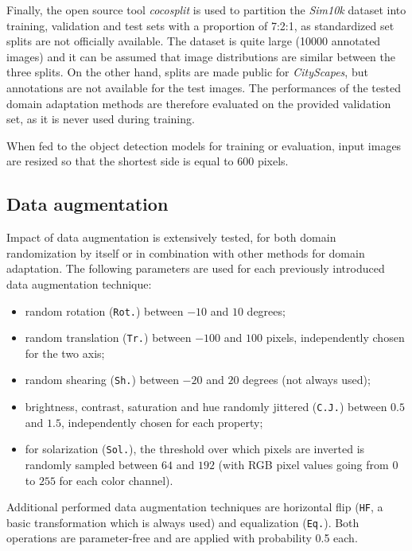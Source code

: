 \documentclass[%
    corpo=12pt,
    twoside,
    stile=classica,   
    tipotesi=magistrale,
    evenboxes,
    english,
	numerazioneromana,
]{toptesi}
\begin{document}
\medskip
Finally, the open source tool \textit{cocosplit}\cite{cocosplit} is used to partition the \textit{Sim10k} dataset into training, validation and test sets with a proportion of 7\string:2\string:1, as standardized set splits are not officially available. The dataset is quite large (10000 annotated images) and it can be assumed that image distributions are similar between the three splits. On the other hand, splits are made public for \textit{CityScapes}, but annotations are not available for the test images. The performances of the tested domain adaptation methods are therefore evaluated on the provided validation set, as it is never used during training.

\medskip
When fed to the object detection models for training or evaluation, input images are resized so that the shortest side is equal to 600 pixels.

\subsection{Data augmentation}
Impact of data augmentation is extensively tested, for both domain randomization by itself or in combination with other methods for domain adaptation. The following parameters are used for each previously introduced data augmentation technique:
\begin{itemize}
	\item random rotation (\texttt{Rot.}) between $ -10 $ and $ 10 $ degrees;
	\item random translation (\texttt{Tr.}) between $ -100 $ and $ 100 $ pixels, independently chosen for the two axis;
	\item random shearing (\texttt{Sh.}) between $-20$ and $20$ degrees (not always used);
	\item brightness, contrast, saturation and hue randomly jittered (\texttt{C.J.}) between $ 0.5 $ and $ 1.5 $, independently chosen for each property;
	\item for solarization (\texttt{Sol.}), the threshold over which pixels are inverted is randomly sampled between $ 64 $ and $ 192 $ (with RGB pixel values going from $ 0 $ to $ 255 $ for each color channel).
\end{itemize}

Additional performed data augmentation techniques are horizontal flip (\texttt{HF}, a basic transformation which is always used) and equalization (\texttt{Eq.}). Both operations are parameter-free and are applied with probability 0.5 each.
\end{document}
